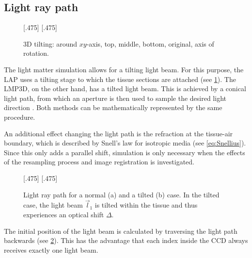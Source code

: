 \subsection{Light ray path}
\label{sec:pathOfLight}
%
\begin{figure}[!t]
\setlength{\tikzheight}{0.42\textwidth}
[.475\textwidth]{}\hfill
{}
[.475\textwidth]{}
\tikzset{external/export=false}
\caption[3D tilting]{3D tilting: around $xy$-axis, \raisebox{.25em}{\tikz \draw[red,thick](0,0)--(0.25,0);} top, \raisebox{.25em}{\tikz \draw[green,thick](0,0)--(0.25,0);} middle, \raisebox{.25em}{\tikz \draw[blue,thick](0,0)--(0.25,0);} bottom, \raisebox{.25em}{\tikz \draw[dash pattern=on 1.25pt off 1.25pt,thick](0,0)--(0.25,0);} original, \raisebox{.25em}{\tikz \draw[gray](0,0)--(0.25,0);} axis of rotation.}
\label{fig:tilting_camera_view}
\end{figure}
%
The light matter simulation allows for a tilting light beam.
For this purpose, the \ac{LAP} uses a tilting stage to which the tissue sections are attached (see \cref{fig:tilting_camera_view}).
The \ac{LMP3D}, on the other hand, has a tilted light beam.
This is achieved by a conical light path, from which an aperture is then used to sample the desired light direction \cite{Wiese:887678}.
Both methods can be mathematically represented by the same procedure.
\par
%
An additional effect changing the light path is the refraction at the tissue-air boundary, which is described by Snell's law for isotropic media (see \cref{eq:Snellius}).
Since this only adds a parallel shift, simulation is only necessary when the effects of the resampling process and image registration is investigated.
\par
%
\begin{figure}[!t]
\setlength{\tikzwidth}{0.45\textwidth}
[.475\textwidth]{
\def\tilt{0}
\def\nindex{2.25}
}\hfill
{}[.475\textwidth]{
}
\caption[Light path]{Light ray path for a normal (a) and a tilted (b) case. In the tilted case, the light beam $\vec{l}_1$ is tilted within the tissue and thus experiences an optical shift $\Delta$.}
\label{fig:tilted_side_view}
\end{figure}
%
The initial position of the light beam is calculated by traversing the light path backwards (see \cref{fig:tilted_side_view}).
This has the advantage that each index inside the \ac{CCD} always receives exactly one light beam.

